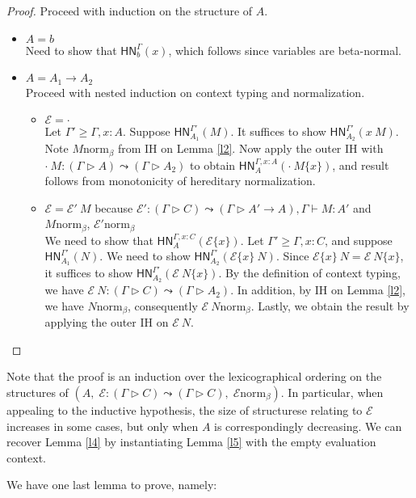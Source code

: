 \documentclass{article}
\newcommand{\hasEF}[3]{\ensuremath{#1 \vdash #2 : #3}}
\newcommand{\hasC}[5]{\ensuremath{#1 : (#2 \rhd #3) \leadsto (#4 \rhd #5)}}
\newcommand{\bnorm}[1]{\ensuremath{#1 \mathrel{\text{norm}_\beta}}}
\newcommand{\hnorm}[3]{\ensuremath{\mathsf{HN}^{#1}_{#2}(#3)}}
\newcommand{\fillin}[2]{\ensuremath{#1\{#2\}}}
\newcommand{\fn}[2]{\ensuremath{#1 \to #2}}
\newcommand{\ap}[2]{\ensuremath{#1\ #2}}
\newcommand{\E}{\mathcal{E}}
\begin{document}
\begin{proof}
Proceed with induction on the structure of $A$.
\begin{itemize}
  \setlength\itemsep{1em}
  \item $A = b$\\
  Need to show that \hnorm{\Gamma}{b}{x}, which follows since variables are beta-normal.
  \item $A = \fn{A_1}{A_2}$\\
  Proceed with nested induction on context typing and normalization.
  \begin{itemize}
  \setlength\itemsep{1em}
  \item $\E = \cdot$\\
  Let $\Gamma' \ge \Gamma,x:A$. Suppose \hnorm{\Gamma'}{A_1}{M}. It suffices to show \hnorm{\Gamma'}{A_2}{\ap{x}{M}}. 
  Note \bnorm{M} from IH on Lemma \ref{l2}.
  Now apply the outer IH with $\hasC{\ap{\cdot}{M}}{\Gamma}{A}{\Gamma}{A_2}$ to obtain 
  \hnorm{\Gamma,x:A}{A}{\fillin{\ap{\cdot}{M}}{x}}, and result follows from monotonicity of hereditary normalization.
  \item $\E = \ap{\E'}{M}$ because $\hasC{\E'}{\Gamma}{C}{\Gamma}{\fn{A'}{A}}, \hasEF{\Gamma}{M}{A'}$ and 
  \bnorm{M}, \bnorm{\E'}\\
  We need to show that \hnorm{\Gamma,x:C}{A}{\fillin{\E}{x}}. Let $\Gamma' \ge \Gamma,x:C$, and 
  suppose \hnorm{\Gamma'}{A_1}{N}. We need to show \hnorm{\Gamma'}{A_2}{\ap{\fillin{\E}{x}}{N}}. Since
  $\ap{\fillin{\E}{x}}{N} = \fillin{\ap{\E}{N}}{x}$, it suffices to show \hnorm{\Gamma'}{A_2}{\fillin{\ap{\E}{N}}{x}}.
  By the definition of context typing, we have \hasC{\ap{\E}{N}}{\Gamma}{C}{\Gamma}{A_2}. In addition, 
  by IH on Lemma \ref{l2}, we have $\bnorm{N}$, consequently $\bnorm{\ap{\E}{N}}$. Lastly, we obtain the result by applying the outer IH on $\ap{\E}{N}$.
  \end{itemize}
\end{itemize}
\end{proof}

Note that the proof is an induction over the lexicographical ordering on the structures of 
$(A,\; \hasC{\E}{\Gamma}{C}{\Gamma}{C},\; \bnorm{\E})$. In particular, when appealing to the inductive hypothesis,
the size of structurese relating to $\E$ increases in some cases, but only when $A$ is correspondingly decreasing. We can recover Lemma \ref{l4} by instantiating Lemma \ref{l5} with the empty evaluation context.

We have one last lemma to prove, namely:
\end{document}
